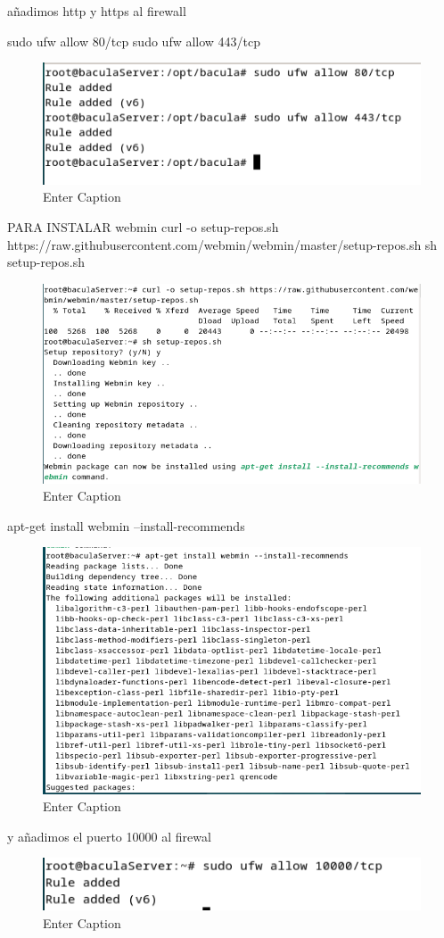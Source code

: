 añadimos http y https al firewall

sudo ufw allow 80/tcp
sudo ufw allow 443/tcp


\begin{figure}[H]
    \centering
    \includegraphics[width=0.5\linewidth]{instalacionBacula/htpsFirewall.png}
    \caption{Enter Caption}
\end{figure}



PARA INSTALAR  webmin 
curl -o setup-repos.sh https://raw.githubusercontent.com/webmin/webmin/master/setup-repos.sh
sh setup-repos.sh

\begin{figure}[H]
    \centering
    \includegraphics[width=0.5\linewidth]{instalacionBacula/CURLwebmin.png}
    \caption{Enter Caption}
\end{figure}


apt-get install webmin --install-recommends


\begin{figure}[H]
    \centering
    \includegraphics[width=0.5\linewidth]{instalacionBacula/instalWebminn.png}
    \caption{Enter Caption}
\end{figure}


y añadimos el puerto 10000 al firewal
\begin{figure}[H]
    \centering
    \includegraphics[width=0.5\linewidth]{instalacionBacula/puerto10000.png}
    \caption{Enter Caption}
\end{figure}


